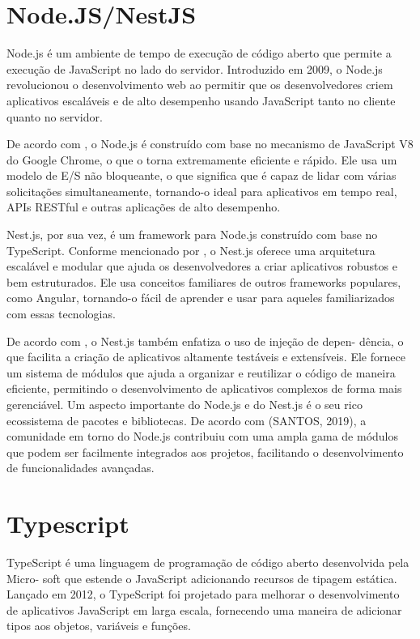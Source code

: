 \section{Node.JS/NestJS}

Node.js é um ambiente de tempo de execução de código aberto que permite a execução de
JavaScript no lado do servidor. Introduzido em 2009, o Node.js revolucionou o desenvolvimento
web ao permitir que os desenvolvedores criem aplicativos escaláveis e de alto desempenho
usando JavaScript tanto no cliente quanto no servidor.

De acordo com \cite{Silva2018}, o Node.js é construído com base
no mecanismo de JavaScript V8 do Google Chrome, o que o torna extremamente eficiente e
rápido. Ele usa um modelo de E/S não bloqueante, o que significa que é capaz de lidar com várias
solicitações simultaneamente, tornando-o ideal para aplicativos em tempo real, APIs RESTful e
outras aplicações de alto desempenho.

Nest.js, por sua vez, é um framework para Node.js construído com base no TypeScript.
Conforme mencionado por \cite{Tavares2020}, o Nest.js oferece uma arquitetura escalável e
modular que ajuda os desenvolvedores a criar aplicativos robustos e bem estruturados.
Ele usa conceitos familiares de outros frameworks populares, como Angular, tornando-o fácil de aprender
e usar para aqueles familiarizados com essas tecnologias.

De acordo com \cite{Johnson2020}, o Nest.js também enfatiza o uso de injeção de depen-
dência, o que facilita a criação de aplicativos altamente testáveis e extensíveis. Ele fornece um
sistema de módulos que ajuda a organizar e reutilizar o código de maneira eficiente, permitindo o
desenvolvimento de aplicativos complexos de forma mais gerenciável. Um aspecto importante do
Node.js e do Nest.js é o seu rico ecossistema de pacotes e bibliotecas. De acordo com (SANTOS,
2019), a comunidade em torno do Node.js contribuiu com uma ampla gama de módulos que
podem ser facilmente integrados aos projetos, facilitando o desenvolvimento de funcionalidades
avançadas.

\section{Typescript}

TypeScript é uma linguagem de programação de código aberto desenvolvida pela Micro-
soft que estende o JavaScript adicionando recursos de tipagem estática. Lançado em 2012, o
TypeScript foi projetado para melhorar o desenvolvimento de aplicativos JavaScript em larga
escala, fornecendo uma maneira de adicionar tipos aos objetos, variáveis e funções.


